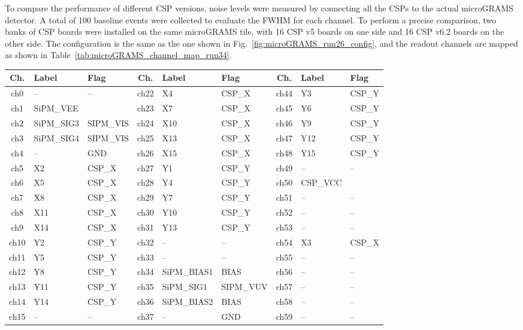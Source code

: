 To compare the performance of different \ac{CSP} versions, noise levels were measured by connecting all the \ac{CSP}s to the actual microGRAMS detector. A total of 100 baseline events were collected to evaluate the \ac{FWHM} for each channel. To perform a precise comparison, two banks of \ac{CSP} boards were installed on the same microGRAMS tile, with 16 \ac{CSP} v5 boards on one side and 16 \ac{CSP} v6.2 boards on the other side. The configuration is the same as the one shown in Fig.~\ref{fig:microGRAMS_run26_config}, and the readout channels are mapped as shown in Table~\ref{tab:microGRAMS_channel_map_run34}.

\begin{table}
\centering
\small
\begin{tabular}{@{}c l l c l l c l l@{}}
\toprule
\textbf{Ch.} & \textbf{Label} & \textbf{Flag} & 
\textbf{Ch.} & \textbf{Label} & \textbf{Flag} & 
\textbf{Ch.} & \textbf{Label} & \textbf{Flag} \\
\midrule
ch0 & -- & -- & ch22 & X4 & CSP\_X & ch44 & Y3 & CSP\_Y \\
ch1 & SiPM\_VEE & & ch23 & X7 & CSP\_X & ch45 & Y6 & CSP\_Y \\
ch2 & SiPM\_SIG3 & SIPM\_VIS & ch24 & X10 & CSP\_X & ch46 & Y9 & CSP\_Y \\
ch3 & SiPM\_SIG4 & SIPM\_VIS & ch25 & X13 & CSP\_X & ch47 & Y12 & CSP\_Y \\
ch4 & -- & GND & ch26 & X15 & CSP\_X & ch48 & Y15 & CSP\_Y \\
ch5 & X2 & CSP\_X & ch27 & Y1 & CSP\_Y & ch49 & -- & -- \\
ch6 & X5 & CSP\_X & ch28 & Y4 & CSP\_Y & ch50 & CSP\_VCC & \\
ch7 & X8 & CSP\_X & ch29 & Y7 & CSP\_Y & ch51 & -- & -- \\
ch8 & X11 & CSP\_X & ch30 & Y10 & CSP\_Y & ch52 & -- & -- \\
ch9 & X14 & CSP\_X & ch31 & Y13 & CSP\_Y & ch53 & -- & -- \\
ch10 & Y2 & CSP\_Y & ch32 & -- & -- & ch54 & X3 & CSP\_X \\
ch11 & Y5 & CSP\_Y & ch33 & -- & -- & ch55 & -- & -- \\
ch12 & Y8 & CSP\_Y & ch34 & SiPM\_BIAS1 & BIAS & ch56 & -- & -- \\
ch13 & Y11 & CSP\_Y & ch35 & SiPM\_SIG1 & SIPM\_VUV & ch57 & -- & -- \\
ch14 & Y14 & CSP\_Y & ch36 & SiPM\_BIAS2 & BIAS & ch58 & -- & -- \\
ch15 & -- & -- & ch37 & -- & GND & ch59 & -- & -- \\

\end{tabular}
\end{table}

